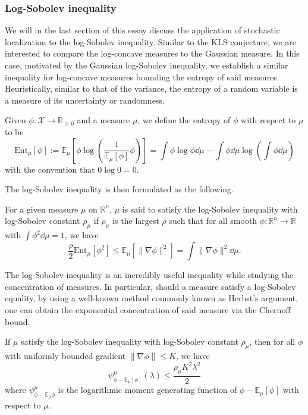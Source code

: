 \subsubsection{Log-Sobolev inequality}

We will in the last section of this essay discuss the application of stochastic localization to the 
log-Sobolev inequality. Similar to the KLS conjecture, we are interested to compare the log-concave 
measures to the Gaussian measure. In this case, motivated by the Gaussian log-Sobolev inequality, 
we establish a similar inequality for log-concave measures bounding the entropy of said measures. 
Heuristically, similar to that of the variance, the entropy of a random variable is a measure of its 
uncertainty or randomness. 

\begin{definition}[Entropy]
  Given \(\phi : \mathcal{X} \to \mathbb{R}_{\ge 0}\) and a measure \(\mu\), we define the entropy of \(\phi\) 
  with respect to \(\mu\) to be 
  \[\text{Ent}_\mu[\phi] := \mathbb{E}_\mu\left[\phi \log\left(\frac{1}{\mathbb{E}_\mu[\phi]} \phi\right)\right]
   = \int \phi \log \phi \dd \mu - \int \phi \dd \mu \log\left(\int \phi \dd \mu\right)\]
  with the convention that \(0\log 0 = 0\).
\end{definition}

The log-Sobolev inequality is then formulated as the following.
\begin{definition}
  For a given measure \(\mu\) on \(\mathbb{R}^n\), \(\mu\) is said to satisfy the log-Sobolev inequality with log-Sobolev 
  constant \(\rho_\mu\) if \(\rho_\mu\) is the largest \(\rho\) such that for all smooth 
  \(\phi : \mathbb{R}^n \to \mathbb{R}\) with \(\int \phi^2 \dd \mu = 1\), we have 
  \[\frac{\rho}{2} \text{Ent}_\mu[\phi^2] \le \mathbb{E}_\mu[\|\nabla \phi\|^2] = \int \|\nabla \phi\|^2 \dd \mu.\]
\end{definition}

The log-Sobolev inequality is an incredibly useful inequality while studying the concentration of measures. In 
particular, should a measure satisfy a log-Sobolev equality, by using a well-known method commonly known as Herbst's argument,
one can obtain the exponential concentration of said measure via the Chernoff bound. 
\begin{theorem}
  If \(\mu\) satisfy the log-Sobolev inequality with log-Sobolev constant \(\rho_\mu\), then for all \(\phi\) with 
  uniformly bounded gradient \(\|\nabla \phi\| \le K\), we have 
  \[\psi_{\phi - \mathbb{E}_\mu[\phi]}^\mu(\lambda) \le \frac{\rho_\mu K^2 \lambda^2}{2}\]
  where \(\psi_{\phi - \mathbb{E}_\mu \phi}^\mu\) is the logarithmic moment generating function of 
  \(\phi - \mathbb{E}_\mu[\phi]\) with respect to \(\mu\).
\end{theorem}
  

